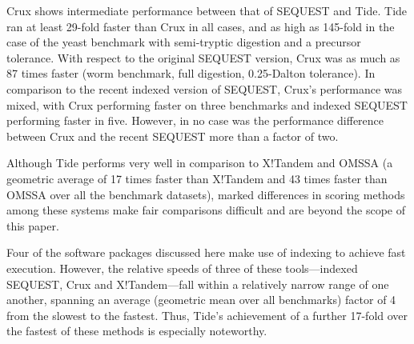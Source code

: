 Crux shows intermediate performance between that of SEQUEST and
Tide. Tide ran at least 29-fold faster than Crux in all cases, and as
high as 145-fold in the case of the yeast benchmark with semi-tryptic
digestion and a \DIFdelbegin {}\DIFdelend \DIFaddbegin {}\DIFaddend precursor tolerance. With respect to
the original SEQUEST version, Crux was as much as 87 times faster
(worm benchmark, full digestion, 0.25-Dalton tolerance). In comparison
to the recent indexed version of SEQUEST, Crux's performance was
mixed, with Crux performing faster on three benchmarks and indexed
SEQUEST performing faster in five. However, in no case was the
performance difference between Crux and the recent SEQUEST more than a
factor of two.

Although Tide performs very well in comparison to X!Tandem and OMSSA
(a geometric average of 17 times faster than X!Tandem and 43 times
faster than OMSSA over all the benchmark datasets), marked differences
in scoring methods among these systems make fair comparisons difficult
and are beyond the scope of this paper.

Four of the software packages discussed here make use of indexing to
achieve fast execution.  However, the relative speeds of three of
these tools---indexed SEQUEST, Crux and X!Tandem---fall within a
relatively narrow range of one another, spanning an average (geometric
mean over all benchmarks) factor of 4 from the slowest to the
fastest. Thus, Tide's achievement of a further 17-fold over the
fastest of these methods is especially noteworthy.

